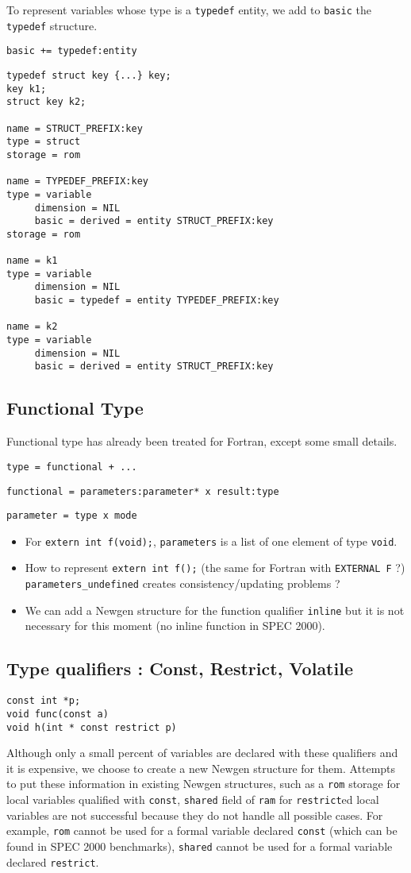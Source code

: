 \documentclass[a4paper]{article}
\begin{document}
To represent variables whose type is a \verb/typedef/ entity, we add to
\verb/basic/ the \verb/typedef/ structure. 

\verb/basic += typedef:entity/ 

\begin{verbatim}
typedef struct key {...} key;
key k1;
struct key k2; 

name = STRUCT_PREFIX:key
type = struct  
storage = rom 

name = TYPEDEF_PREFIX:key 
type = variable 
     dimension = NIL
     basic = derived = entity STRUCT_PREFIX:key
storage = rom

name = k1
type = variable 
     dimension = NIL
     basic = typedef = entity TYPEDEF_PREFIX:key

name = k2
type = variable 
     dimension = NIL
     basic = derived = entity STRUCT_PREFIX:key
\end{verbatim}  
\subsection{Functional Type}
Functional type has already been treated for Fortran, except some small details.

\verb/type = functional + .../

\verb/functional = parameters:parameter* x result:type/

\verb/parameter = type x mode /

\begin{itemize}
\item For \verb/extern int f(void);/, \verb/parameters/ is a list of one element of type
\verb/void/.
\item How to represent \verb/extern int f();/ (the same for Fortran with
\verb/EXTERNAL F/ ?) \verb/parameters_undefined/ creates
consistency/updating problems ?
\item We can add a Newgen structure for the function qualifier \verb/inline/ but
it is not necessary for this moment (no inline function in SPEC 2000).
\end{itemize}
\subsection{Type qualifiers : Const, Restrict, Volatile}
\label{type_qualifiers}
\begin{verbatim}
const int *p;
void func(const a)
void h(int * const restrict p)
\end{verbatim}
Although only a small percent of variables are declared with these
qualifiers and it is expensive, we choose to create a new Newgen structure for them. Attempts
to put these information in existing Newgen
structures, such as a \verb/rom/
storage for local variables qualified with \verb/const/, \verb/shared/
field of \verb/ram/ for \verb/restrict/ed local variables are not
successful because they do not handle all possible
cases. For example, \verb/rom/ cannot be used for a formal variable declared \verb/const/ (which
can be found in SPEC 2000 benchmarks),  \verb/shared/ cannot be used for a
formal variable declared \verb/restrict/.  
\end{document}
